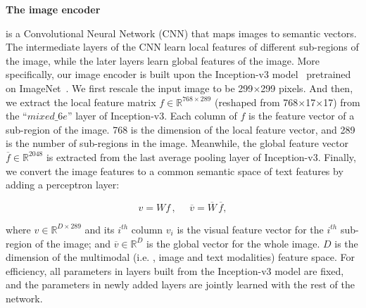 \textbf{The image encoder }{ is a Convolutional Neural Network (CNN) that maps images to semantic vectors. The intermediate layers of the CNN learn local features of different sub-regions of the image, while the later layers learn global features of the image. More specifically, our image encoder is built upon the Inception-v3 model~\cite{SzegedyVISW16} pretrained on ImageNet~\cite{ILSVRC15}. We first rescale the input image to be 299$\times$299 pixels. And then, we extract the local feature matrix $f \in \mathbb{R}^{768\times289}$ (reshaped from 768$\times$17$\times$17) from the ``$mixed\_6e$'' layer of Inception-v3. Each column of $f$ is the feature vector of a sub-region of the image. 768 is the dimension of the local feature vector, and 289 is the number of sub-regions in the image. Meanwhile, the global feature vector $\overline{f} \in \mathbb{R}^{2048}$ is extracted from the last average pooling layer of Inception-v3. Finally, we convert the image features to a common semantic space of text features by adding a perceptron layer:

\begin{equation}\label{eq:localFtr}
  v = W f\,, \, \, \, \,\, \, \, \, \overline{v} = \overline{W}\,\overline{f},
 \end{equation}

where $v \in \mathbb{R}^{D\times289}$ and its $i^{th}$ column $v_{i}$ is the visual feature vector for the $i^{th}$ sub-region of the image; and $\overline{v} \in \mathbb{R}^{D}$ is the global vector for the whole image. $D$ is the dimension of the multimodal (i.e. , image and text modalities) feature space. For efficiency, all parameters in layers built from the Inception-v3 model are fixed, and the parameters in newly added layers are jointly learned with the rest of the network. }

